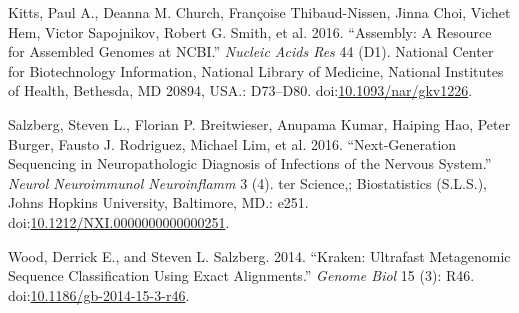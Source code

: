 \documentclass[]{article}
\begin{document}
\hypertarget{ref-PKittsux5fAKimchi2016-NAR}{}
Kitts, Paul A., Deanna M. Church, Françoise Thibaud-Nissen, Jinna Choi,
Vichet Hem, Victor Sapojnikov, Robert G. Smith, et al. 2016. ``Assembly:
A Resource for Assembled Genomes at NCBI.'' \emph{Nucleic Acids Res} 44
(D1). National Center for Biotechnology Information, National Library of
Medicine, National Institutes of Health, Bethesda, MD 20894, USA.:
D73--D80.
doi:\href{https://doi.org/10.1093/nar/gkv1226}{10.1093/nar/gkv1226}.

\hypertarget{ref-SSalzbergux5fCPardo2016-NNN}{}
Salzberg, Steven L., Florian P. Breitwieser, Anupama Kumar, Haiping Hao,
Peter Burger, Fausto J. Rodriguez, Michael Lim, et al. 2016.
``Next-Generation Sequencing in Neuropathologic Diagnosis of Infections
of the Nervous System.'' \emph{Neurol Neuroimmunol Neuroinflamm} 3 (4).
ter Science,; Biostatistics (S.L.S.), Johns Hopkins University,
Baltimore, MD.: e251.
doi:\href{https://doi.org/10.1212/NXI.0000000000000251}{10.1212/NXI.0000000000000251}.

\hypertarget{ref-DWoodux5fSSalzberg2014-GB}{}
Wood, Derrick E., and Steven L. Salzberg. 2014. ``Kraken: Ultrafast
Metagenomic Sequence Classification Using Exact Alignments.''
\emph{Genome Biol} 15 (3): R46.
doi:\href{https://doi.org/10.1186/gb-2014-15-3-r46}{10.1186/gb-2014-15-3-r46}.
\end{document}
